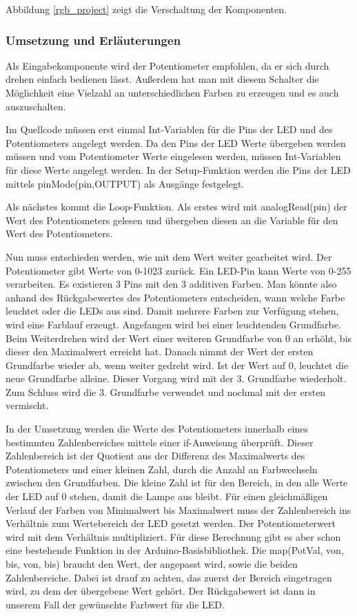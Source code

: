 Abbildung \ref{rgb_project} zeigt die Verschaltung der Komponenten.
 
\subsubsection{Umsetzung und Erläuterungen}
Als Eingabekomponente wird der Potentiometer empfohlen, da er sich durch drehen einfach bedienen lässt. Außerdem hat man mit diesem Schalter die Möglichkeit eine Vielzahl an unterschiedlichen Farben zu erzeugen und es auch auszuschalten.
 
Im Quellcode müssen erst einmal Int-Variablen für die Pins der LED und des Potentiometers angelegt werden. Da den Pins der LED Werte übergeben werden müssen und vom Potentiometer Werte eingelesen werden, müssen Int-Variablen für diese Werte angelegt werden.
In der Setup-Funktion werden die Pins der LED mittels pinMode(pin,OUTPUT) als Ausgänge festgelegt.

Als nächstes kommt die Loop-Funktion. Als erstes wird mit analogRead(pin) der Wert des Potentiometers gelesen und übergeben diesen an die Variable für den Wert des Potentiometers.

Nun muss entschieden werden, wie mit dem Wert weiter gearbeitet wird. Der Potentiometer gibt Werte von 0-1023 zurück. Ein LED-Pin kann Werte von 0-255 verarbeiten. Es existieren 3 Pins mit den 3 additiven Farben. Man könnte also anhand des Rückgabewertes des Potentiometers entscheiden, wann welche Farbe leuchtet oder die LEDs aus sind. Damit mehrere Farben zur Verfügung stehen, wird eine Farblauf erzeugt. Angefangen wird bei einer leuchtenden Grundfarbe. Beim Weiterdrehen wird der Wert einer weiteren Grundfarbe von 0 an erhöht, bis dieser den Maximalwert erreicht hat. Danach nimmt der Wert der ersten Grundfarbe wieder ab, wenn weiter gedreht wird. Ist der Wert auf 0, leuchtet die neue Grundfarbe alleine. Dieser Vorgang wird mit der 3. Grundfarbe wiederholt. Zum Schluss wird die 3. Grundfarbe verwendet und nochmal mit der ersten vermischt.

In der Umsetzung werden die Werte des Potentiometers innerhalb eines bestimmten Zahlenbereiches mittels einer if-Anweisung überprüft. Dieser Zahlenbereich ist der Quotient aus der Differenz des Maximalwerts des Potentiometers und einer kleinen Zahl, durch die Anzahl an Farbwechseln zwischen den Grundfarben. Die kleine Zahl ist für den Bereich, in den alle Werte der LED auf 0 stehen, damit die Lampe aus bleibt. Für einen gleichmäßigen Verlauf der Farben von Minimalwert bis Maximalwert muss der Zahlenbereich ins Verhältnis zum Wertebereich der LED gesetzt werden. Der Potentiometerwert wird mit dem Verhältnis multipliziert. Für diese Berechnung gibt es aber schon eine bestehende Funktion in der Arduino-Basisbibliothek. Die map(PotVal, von, bis, von, bis) braucht den Wert, der angepasst wird, sowie die beiden Zahlenbereiche. Dabei ist drauf zu achten, das zuerst der Bereich eingetragen wird, zu dem der übergebene Wert gehört. Der Rückgabewert ist dann in unserem Fall der gewünschte Farbwert für die LED.

